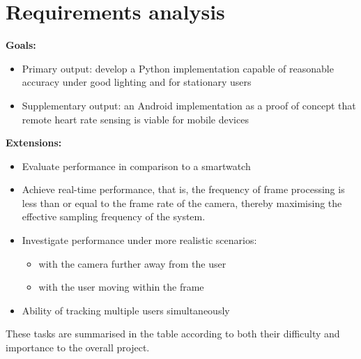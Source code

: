 \section{Requirements analysis}
\textbf{Goals:}
\begin{itemize}
    \item Primary output: develop a Python implementation capable of reasonable accuracy under good lighting and for stationary users
    \item Supplementary output: an Android implementation as a proof of concept that remote heart rate sensing is viable for mobile devices
\end{itemize}
\textbf{Extensions:}
\begin{itemize}
   \item Evaluate performance in comparison to a smartwatch
   \item Achieve real-time performance, that is, the frequency of frame processing is less than or equal to the frame rate of the camera, thereby maximising the effective sampling frequency of the system.
   \item Investigate performance under more realistic scenarios:
        \begin{itemize}
            \item with the camera further away from the user
            \item with the user moving within the frame
        \end{itemize}
    \item Ability of tracking multiple users simultaneously
\end{itemize}
These tasks are summarised in the table according to both their difficulty and importance to the overall project.
